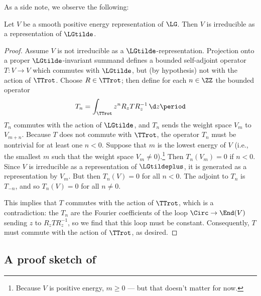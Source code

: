 As a side note, we observe the following:

\begin{prop}
	Let $V$ be a smooth positive energy representation of $\LG$. Then $V$ is
	irreducible as a representation of $\LGtilde$.
\end{prop}

\begin{proof}
	Assume $V$ is not irreducible as a $\LGtilde$-representation. Projection onto
	a proper $\LGtilde$-invariant summand defines a bounded self-adjoint operator
	$T:V\to V$ which commutes with $\LGtilde$, but (by hypothesis) not with the action
	of $\TTrot$. Choose $R\in\TTrot$; then define for each $n\in \ZZ$ the bounded operator
	\begin{equation}
		T_n = \int_{\TTrot} z^n R_z T R_z^{-1}\, \d z\period
	\end{equation}
	$T_n$ commutes with the action of $\LGtilde$, and $T_n$ sends the weight space
	$V_m$ to $V_{m+n}$. Because $T$ does not commute with $\TTrot$, the
	operator $T_n$ must be nontrivial for at least one $n<0$. Suppose that $m$
	is the lowest energy of $V$ (i.e., the smallest $m$ such that the weight
	space $V_m \neq 0$).\footnote{Because $V$ is positive energy, $m\geq 0$ --- but
	that doesn't matter for now.} Then $T_n(V_m) = 0$ if $n<0$. Since $V$ is
	irreducible as a representation of $\LGtildeplus$, it is generated as a
	representation by $V_m$.  But then $T_n(V) = 0$ for all $n<0$. The adjoint
	to $T_n$ is $T_{-n}$, and so $T_n(V) = 0$ for all $n\neq 0$.

	This implies that $T$ commutes with the action of $\TTrot$, which is a
	contradiction: the $T_n$ are the Fourier coefficients of the loop
	$\Circ\to \End(V)$ sending $z$ to $R_z T R_z^{-1}$, so we find that this loop
	must be constant.  Consequently, $T$ must commute with the action of
	$\TTrot$, as desired. 
\end{proof}


\subsection{A proof sketch of \texorpdfstring{}{Theorem \ref*{main-thm}}}
\label{PS_proof_sketch}


